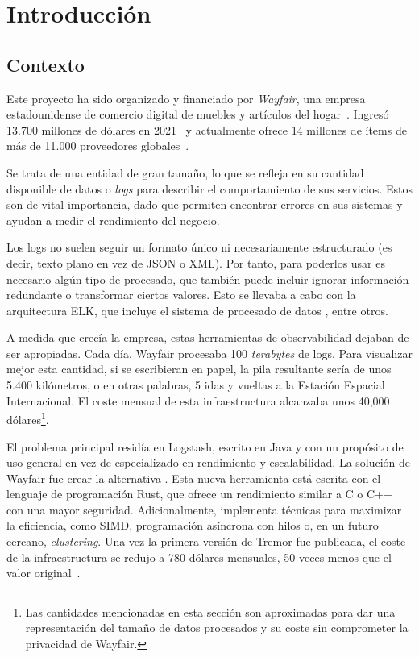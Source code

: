 
\chapter{Introducción}

\section{Contexto}

Este proyecto ha sido organizado y financiado por \emph{Wayfair}, una empresa
estadounidense de comercio digital de muebles y artículos del
hogar~\cite{wayfair}. Ingresó 13.700 millones de dólares en
2021~\cite{wayfairRevenue} y actualmente ofrece 14 millones de ítems de más de
11.000 proveedores globales~\cite{wayfairItems}.

Se trata de una entidad de gran tamaño, lo que se refleja en su cantidad
disponible de datos o \emph{logs} para describir el comportamiento de sus
servicios. Estos son de vital importancia, dado que permiten encontrar errores
en sus sistemas y ayudan a medir el rendimiento del negocio.

Los logs no suelen seguir un formato único ni necesariamente estructurado (es
decir, texto plano en vez de JSON o XML). Por tanto, para poderlos usar es
necesario algún tipo de procesado, que también puede incluir ignorar información
redundante o transformar ciertos valores. Esto se llevaba a cabo con la
arquitectura ELK, que incluye el sistema de procesado de datos
, entre otros.

A medida que crecía la empresa, estas herramientas de observabilidad dejaban de
ser apropiadas. Cada día, Wayfair procesaba 100 \emph{terabytes} de logs. Para
visualizar mejor esta cantidad, si se escribieran en papel, la pila resultante
sería de unos 5.400 kilómetros, o en otras palabras, 5 idas y vueltas a la
Estación Espacial Internacional. El coste mensual de esta infraestructura
alcanzaba unos 40,000 dólares\footnote{Las cantidades mencionadas en esta
sección son aproximadas para dar una representación del tamaño de datos
procesados y su coste sin comprometer la privacidad de Wayfair.}.

El problema principal residía en Logstash, escrito en Java y con un propósito de
uso general en vez de especializado en rendimiento y escalabilidad. La solución
de Wayfair fue crear la alternativa . Esta nueva herramienta
está escrita con el lenguaje de programación Rust, que ofrece un rendimiento
similar a C o C++ con una mayor seguridad. Adicionalmente, implementa técnicas
para maximizar la eficiencia, como SIMD, programación asíncrona con hilos o, en
un futuro cercano, \emph{clustering}. Una vez la primera versión de Tremor fue
publicada, el coste de la infraestructura se redujo a 780 dólares mensuales, 50
veces menos que el valor original~\cite{tremorcon_lll}.

